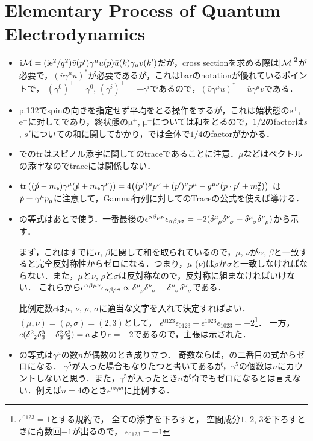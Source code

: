 \section{Elementary Process of Quantum Electrodynamics}
\begin{itemize}
	\item $\i\M = (\i\e^2/q^2)\bar{v}(p')\gamma^{\mu}u(p)\bar{u}(k)\gamma_{\mu}v(k')$だが，cross sectionを求める際は$\abs{\M}^2$が必要で，$(\bar{v}\gamma^{\mu}u)^{*}$が必要であるが，これはbarのnotationが優れているポイントで，
		$(\gamma^0)^{\top} = \gamma^{0}$, $(\gamma^{i})^{\top} =- \gamma^{i}$であるので，$(\bar{v}\gamma^{\mu}u)^{*} = \bar{u}\gamma^{\mu}v$である．
	\item p.132でspinの向きを指定せず平均をとる操作をするが，これは始状態の$\mathrm{e^+}$, $\mathrm{e^-}$に対してであり，終状態の$\mathrm{\mu^+}$, $\mathrm{\mu^-}$については和をとるので，$1/2$のfactorは$s$, $s'$についての和に関してかかり，では全体で$1/4$のfactorがかかる．
	\item {}での$\tr$はスピノル添字に関してのtraceであることに注意．$\mu$などはベクトルの添字なのでtraceには関係しない．
	\item $\tr\qty((\slashed{p} -m_{\elec})\gamma^{\mu}(\slashed{p}+m_{\elec}\gamma^{\nu})) = 4\qty((p')^\mu p^\nu + (p')^\nu p^\mu - g^{\mu\nu}(p\cdot p' + m_\elec^2))$
		は$\slashed{p} = \gamma^{\mu} p_\mu$に注意して，Gamma行列に対してのTraceの公式を使えば導ける．
	\item {}の等式はあとで使う．一番最後の$\epsilon^{\alpha\beta\mu\nu} \epsilon_{\alpha\beta\rho\sigma} = -2(\delta\indices{^\mu_\rho}\delta\indices{^\nu_\sigma} - \delta\indices{^\mu_\sigma}\delta\indices{^\nu_\rho})$から示す．

		まず，これはすでに$\alpha$, $\beta$に関して和を取られているので，$\mu$, $\nu$が$\alpha$, $\beta$と一致すると完全反対称性からゼロになる．つまり，$\mu$ ($\nu$)は$\rho$か$\sigma$と一致しなければならない．また，$\mu$と$\nu$, $\rho$と$\sigma$は反対称なので，反対称に組まなければいけない．
		これらから$\epsilon^{\alpha\beta\mu\nu} \epsilon_{\alpha\beta\rho\sigma} \propto \delta\indices{^\mu_\rho}\delta\indices{^\nu_\sigma} - \delta\indices{^\mu_\sigma}\delta\indices{^\nu_\rho}$である．
		
		比例定数$c$は$\mu$, $\nu$, $\rho$, $\sigma$に適当な文字を入れて決定すればよい．$(\mu, \nu) = (\rho, \sigma) = (2, 3)$として，
		$\epsilon^{0123}\epsilon_{0123}  + \epsilon^{1023}\epsilon_{1023} = -2$\footnote{$\epsilon^{0123} = 1$とする規約で，
		全ての添字を下ろすと，
		空間成分$1$, $2$, $3$を下ろすときに奇数回$-1$が出るので，
		$\epsilon_{0123} = -1$}．
		一方，$c(\delta\indices{^2_2}\delta{^3_3} - \delta{^2_3}\delta{^3_2}) = a$より$c = -2$であるので，主張は示された．
	\item {}の等式は$\gamma^{\mu}$の数$n$が偶数のとき成り立つ．
		奇数ならば，の二番目の式からゼロになる．
		$\gamma^5$が入った場合もなりたつと書いてあるが，$\gamma^{5}$の個数は$n$にカウントしないと思う．また，$\gamma^5$が入ったとき$n$が奇でもゼロになるとは言えない．例えば$n=4$のとき$\epsilon^{\mu\nu\rho\sigma}$に比例する．
\end{itemize}
